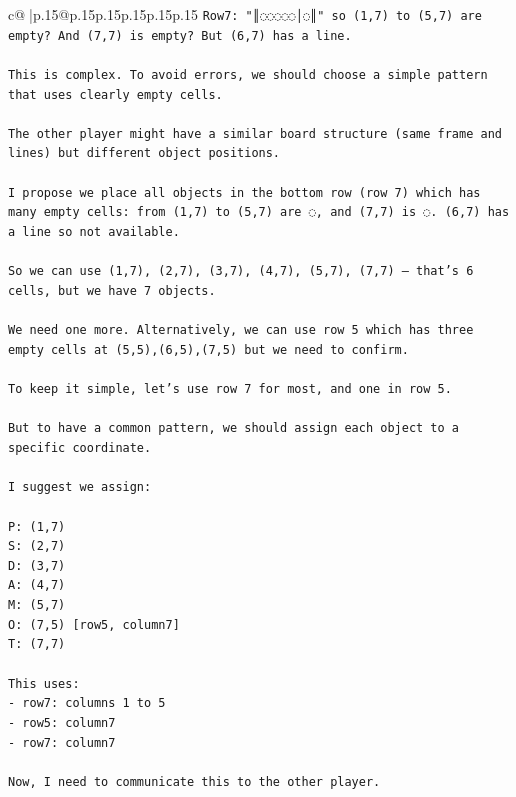 \documentclass{article}
\begin{document}
{\begin{supertabular}{c@{$\;$}|p{.15\linewidth}@{}p{.15\linewidth}p{.15\linewidth}p{.15\linewidth}p{.15\linewidth}p{.15\linewidth}}
{{{\texttt{Row7: "║◌◌◌◌◌│◌║" so (1,7) to (5,7) are empty? And (7,7) is empty? But (6,7) has a line.} \\
\\ 
\texttt{This is complex. To avoid errors, we should choose a simple pattern that uses clearly empty cells.} \\
\\ 
\texttt{The other player might have a similar board structure (same frame and lines) but different object positions.} \\
\\ 
\texttt{I propose we place all objects in the bottom row (row 7) which has many empty cells: from (1,7) to (5,7) are ◌, and (7,7) is ◌. (6,7) has a line so not available.} \\
\\ 
\texttt{So we can use (1,7), (2,7), (3,7), (4,7), (5,7), (7,7) — that's 6 cells, but we have 7 objects.} \\
\\ 
\texttt{We need one more. Alternatively, we can use row 5 which has three empty cells at (5,5),(6,5),(7,5) but we need to confirm.} \\
\\ 
\texttt{To keep it simple, let's use row 7 for most, and one in row 5.} \\
\\ 
\texttt{But to have a common pattern, we should assign each object to a specific coordinate.} \\
\\ 
\texttt{I suggest we assign:} \\
\\ 
\texttt{P: (1,7)} \\
\texttt{S: (2,7)} \\
\texttt{D: (3,7)} \\
\texttt{A: (4,7)} \\
\texttt{M: (5,7)} \\
\texttt{O: (7,5)   {[}row5, column7{]}} \\
\texttt{T: (7,7)} \\
\\ 
\texttt{This uses:} \\
\texttt{{-} row7: columns 1 to 5} \\
\texttt{{-} row5: column7} \\
\texttt{{-} row7: column7} \\
\\ 
\texttt{Now, I need to communicate this to the other player.} \\
}}}
\end{supertabular}}
\end{document}
